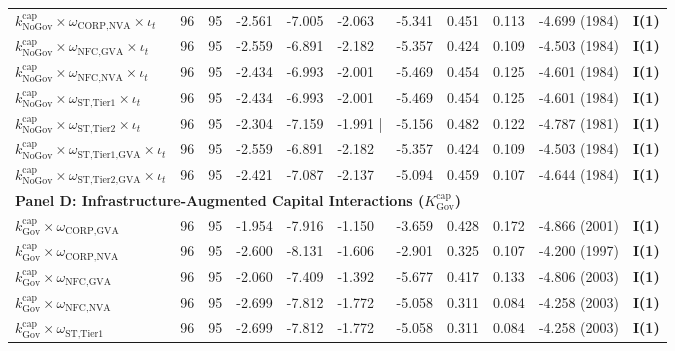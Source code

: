 \documentclass[11pt,a4paper]{article}
\begin{document}
\begin{landscape}
\begin{table}[h!]
\begin{tabular}{p{6.0cm} p{0.6cm} p{0.6cm} p{1.5cm} p{1.5cm} p{1.5cm} p{1.5cm} p{1.5cm} p{1.5cm} p{2.2cm} p{2.2cm}}
$k^{\text{cap}}_{\text{NoGov}} \times \omega_{\text{CORP,NVA}} \times \iota_t$ & 96 & 95 & -2.561 & -7.005 & -2.063 & -5.341 & 0.451 & 0.113 & -4.699 (1984) & \textbf{I(1)} \\
$k^{\text{cap}}_{\text{NoGov}} \times \omega_{\text{NFC,GVA}} \times \iota_t$ & 96 & 95 & -2.559 & -6.891 & -2.182 & -5.357 & 0.424 & 0.109 & -4.503 (1984) & \textbf{I(1)} \\
$k^{\text{cap}}_{\text{NoGov}} \times \omega_{\text{NFC,NVA}} \times \iota_t$ & 96 & 95 & -2.434 & -6.993 & -2.001 & -5.469 & 0.454 & 0.125 & -4.601 (1984) & \textbf{I(1)} \\
$k^{\text{cap}}_{\text{NoGov}} \times \omega_{\text{ST,Tier1}} \times \iota_t$ & 96 & 95 & -2.434 & -6.993 & -2.001 & -5.469 & 0.454 & 0.125 & -4.601 (1984) & \textbf{I(1)} \\
$k^{\text{cap}}_{\text{NoGov}} \times \omega_{\text{ST,Tier2}} \times \iota_t$ & 96 & 95 & -2.304 & -7.159 & -1.991 | & -5.156 & 0.482 & 0.122 & -4.787 (1981) & \textbf{I(1)} \\
$k^{\text{cap}}_{\text{NoGov}} \times \omega_{\text{ST,Tier1,GVA}} \times \iota_t$ & 96 & 95 & -2.559 & -6.891 & -2.182 & -5.357 & 0.424 & 0.109 & -4.503 (1984) & \textbf{I(1)} \\
$k^{\text{cap}}_{\text{NoGov}} \times \omega_{\text{ST,Tier2,GVA}} \times \iota_t$ & 96 & 95 & -2.421 & -7.087 & -2.137 & -5.094 & 0.459 & 0.107 & -4.644 (1984) & \textbf{I(1)} \\
\midrule
\multicolumn{11}{l}{\textbf{Panel D: Infrastructure-Augmented Capital Interactions ($K^{\text{cap}}_{\text{Gov}}$)}} \\
\midrule
$k^{\text{cap}}_{\text{Gov}} \times \omega_{\text{CORP,GVA}}$ & 96 & 95 & -1.954 & -7.916 & -1.150 & -3.659 & 0.428 & 0.172 & -4.866 (2001) & \textbf{I(1)} \\
$k^{\text{cap}}_{\text{Gov}} \times \omega_{\text{CORP,NVA}}$ & 96 & 95 & -2.600 & -8.131 & -1.606 & -2.901 & 0.325 & 0.107 & -4.200 (1997) & \textbf{I(1)} \\
$k^{\text{cap}}_{\text{Gov}} \times \omega_{\text{NFC,GVA}}$ & 96 & 95 & -2.060 & -7.409 & -1.392 & -5.677 & 0.417 & 0.133 & -4.806 (2003) & \textbf{I(1)} \\
$k^{\text{cap}}_{\text{Gov}} \times \omega_{\text{NFC,NVA}}$ & 96 & 95 & -2.699 & -7.812 & -1.772 & -5.058 & 0.311 & 0.084 & -4.258 (2003) & \textbf{I(1)} \\
$k^{\text{cap}}_{\text{Gov}} \times \omega_{\text{ST,Tier1}}$ & 96 & 95 & -2.699 & -7.812 & -1.772 & -5.058 & 0.311 & 0.084 & -4.258 (2003) & \textbf{I(1)} \\

\end{tabular}
\end{table}
\end{landscape}
\end{document}
